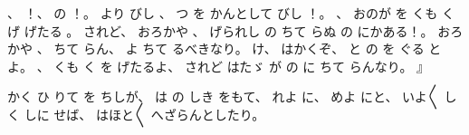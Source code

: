 、
%
！、
%
の
！。
%
より
びし
、
%
つ
を
かんとして
びし
！。
%
、
%
おのが
を
くも
く
げ
げたる
。
%
されど、
%
おろかや
、
%
げられし
の
ちて
らぬ
の
にかある！。
%
おろかや
、
%
ちて
らん、
%
よ
ちて
るべきなり。
%
け、
%
はかくぞ、
%
と
の
を
ぐる
とよ。
%
、
%
くも
く
を
げたるよ、
%
されど
はたゞ
が
の
に
ちて
らんなり。
』

かく
ひ
りて
を
ちしが、
%
は
の
しき
をもて、
%
れよ
に、
%
めよ
にと、
%
いよ〳〵
しく
しに
せば、
%
はほと〳〵
へざらんとしたり。

